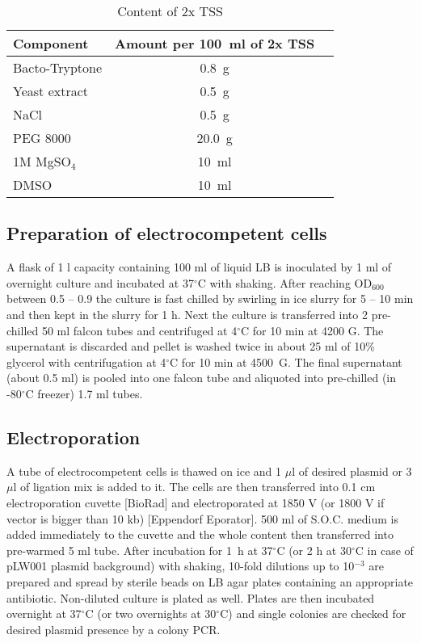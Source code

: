 
\begin{center}
	\begin{longtable}[c]{|l|c|c|}
\caption{Content of 2x TSS} \label{tss} \\

\toprule \multicolumn{1}{|l|}{\textbf{Component}} & \multicolumn{1}{c|}{\textbf{Amount per 100~ml of 2x TSS}} \\
\midrule
\endhead

\bottomrule
\endlastfoot

Bacto-Tryptone & 0.8~g \\
\hline
Yeast extract & 0.5~g \\
\hline
NaCl & 0.5~g \\
\hline
PEG 8000 & 20.0~g \\
\hline
1M MgSO$_{4}$ & 10~ml \\
\hline
DMSO & 10~ml \\
	\end{longtable}
\end{center}

\subsection{Preparation of electrocompetent cells}
A flask of 1 l capacity containing 100 ml of liquid LB is inoculated by 1 ml of overnight culture and incubated at 37$^{\circ}$C with shaking.
After reaching OD$_{600}$ between 0.5 -- 0.9 the culture is fast chilled by swirling in ice slurry for 5 -- 10 min and then kept in the slurry for 1 h.
Next the culture is transferred into 2 pre-chilled 50 ml falcon tubes and centrifuged at 4$^{\circ}$C for 10 min at 4200 G.
The supernatant is discarded and pellet is washed twice in about 25 ml of 10\% glycerol with centrifugation at 4$^{\circ}$C for 10 min at 4500~G.
The final supernatant (about 0.5 ml) is pooled into one falcon tube and aliquoted into pre-chilled (in -80$^{\circ}$C freezer) 1.7 ml tubes.

\subsection{Electroporation}
A tube of electrocompetent cells is thawed on ice and 1 $\mu$l of desired plasmid or 3 $\mu$l of ligation mix is added to it.
The cells are then transferred into 0.1 cm electroporation cuvette [BioRad] and electroporated at 1850 V (or 1800 V if vector is bigger than 10 kb) [Eppendorf Eporator\textsuperscript{\textregistered}].
500 ml of S.O.C. medium is added immediately to the cuvette and the whole content then transferred into pre-warmed 5 ml tube.
After incubation for 1~h at 37$^{\circ}$C (or 2 h at 30$^{\circ}$C in case of pLW001 plasmid background) with shaking, 10-fold dilutions up to 10$^{-3}$ are prepared and spread by sterile beads on LB agar plates containing an appropriate antibiotic.
Non-diluted culture is plated as well.
Plates are then incubated overnight at 37$^{\circ}$C (or two overnights at 30$^{\circ}$C) and single colonies are checked for desired plasmid presence by a colony PCR.


